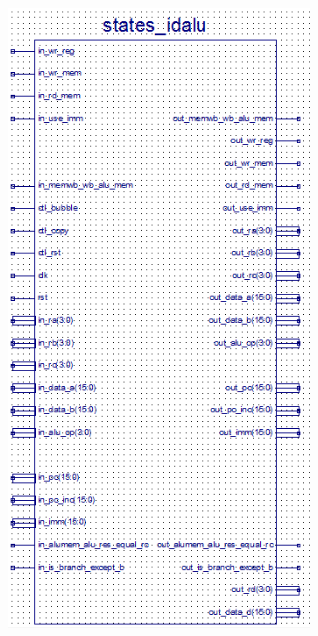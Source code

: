 \begin{center}
    \includegraphics[width=8cm]{image/detail/detail_idalu.png}
    \label{fig:idalu}
\end{center}

